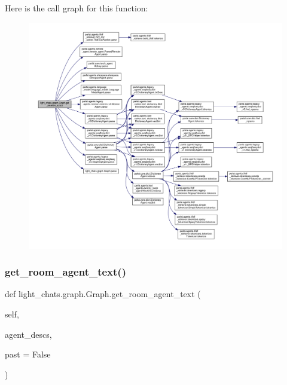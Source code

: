 Here is the call graph for this function\+:
\nopagebreak
\begin{figure}[H]
\begin{center}
\leavevmode
\includegraphics[width=350pt]{classlight__chats_1_1graph_1_1Graph_a7b3fe43bf1e2b53fe7a2e22a24d77ef2_cgraph}
\end{center}
\end{figure}
\mbox{\label{classlight__chats_1_1graph_1_1Graph_abe32388ae807a26036573890d1293e2a}} 
\subsubsection{\texorpdfstring{get\+\_\+room\+\_\+agent\+\_\+text()}{get\_room\_agent\_text()}}
{\footnotesize\ttfamily def light\+\_\+chats.\+graph.\+Graph.\+get\+\_\+room\+\_\+agent\+\_\+text (\begin{DoxyParamCaption}\item[{}]{self,  }\item[{}]{agent\+\_\+descs,  }\item[{}]{past = {\ttfamily False} }\end{DoxyParamCaption})}

